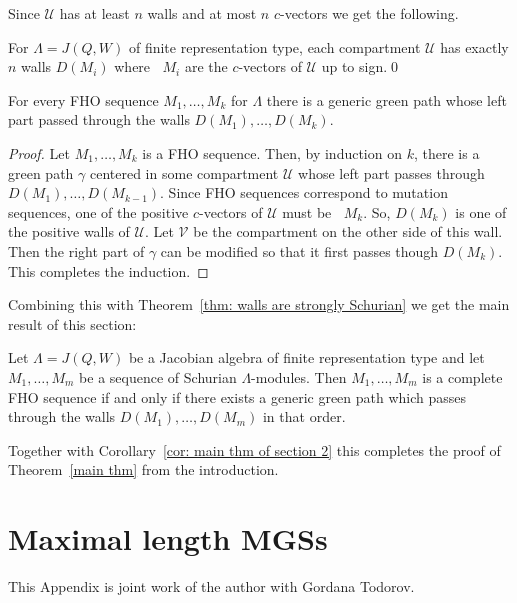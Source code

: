 \documentclass[ALCO,ThmDefs,Unicode,epreuves]{cedram}
\DeclareMathOperator{\undim}{\underline{dim}}
\newcommand{\cU}{\ensuremath{{\mathcal{U}}}}
\newcommand{\cV}{\ensuremath{{\mathcal{V}}}}
\begin{document}
Since $\cU$ has at least $n$ walls and at most $n$ $c$-vectors we get the following.

\begin{coro}
For $\Lambda=J(Q,W)$ of finite representation type, each compartment $\cU$ has exactly $n$ walls $D(M_i)$ where $\undim M_i$ are the $c$-vectors of $\cU$ up to sign.\qed
\end{coro}

\begin{coro}\label{cor: formerly 3.16}
For every FHO sequence $M_1,\ldots,M_k$ for $\Lambda$ there is a generic green path whose left part passed through the walls $D(M_1),\ldots,D(M_k)$.
\end{coro}

\begin{proof}
Let $M_1,\ldots,M_{k}$ is a FHO sequence. Then, by induction on $k$, there is a green path $\gamma$ centered in some compartment $\cU$ whose left part passes through $D(M_1),\ldots,D(M_{k-1})$. Since FHO sequences correspond to mutation sequences, one of the positive $c$-vectors of $\cU$ must be $\undim M_k$. So, $D(M_k)$ is one of the positive walls of $\cU$. Let $\cV$ be the compartment on the other side of this wall. Then the right part of $\gamma$ can be modified so that it first passes though $D(M_k)$. This completes the induction.
\end{proof}

Combining this with Theorem~\ref{thm: walls are strongly Schurian} we get the main result of this section:

\begin{theo}\label{main thm of section three}
Let $\Lambda=J(Q,W)$ be a Jacobian algebra of finite representation type and let $M_1,\ldots,M_m$ be a sequence of Schurian $\Lambda$-modules. Then $M_1,\ldots,M_m$ is a complete FHO sequence if and only if there exists a generic green path which passes through the walls $D(M_1),\ldots,D(M_m)$ in that order.
\end{theo}

Together with Corollary~\ref{cor: main thm of section 2} this completes the proof of Theorem~\ref{main thm} from the introduction.


\appendix

\section{Maximal length MGSs}


This Appendix is joint work of the author with Gordana Todorov.
\end{document}
